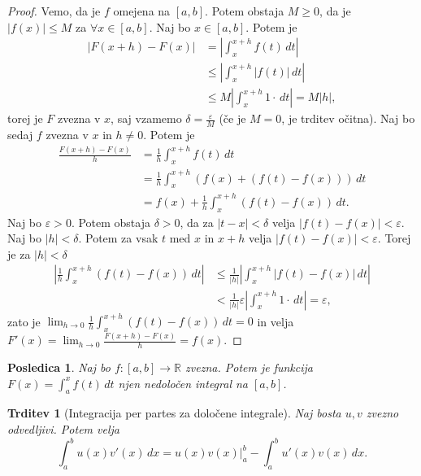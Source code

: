 \documentclass[10pt, a4paper]{article}
\newtheorem{posledica}[izr]{Posledica}
\newtheorem{trditev}[izr]{Trditev}
\newenvironment{noticeC}{%
  \tcolorbox[%
  notitle,
  empty,
  enhanced,  %
  breakable,
  coltext=black, 
  fontupper=\rmfamily,
  parbox=false,
  noparskip,
  sharp corners,
  boxrule=-1pt,  %
  frame hidden,
  left=7pt,  %
  right=7pt,
  top=5pt,
  bottom=5pt,
  before skip=2.5ex plus 2pt,
  after skip=2.5ex plus 2pt,
  overlay unbroken and last={%
  },
  ]}
{\endtcolorbox}
\newenvironment{dokaz}%
  {\begin{noticeC}\begin{proof}}%
  {\end{proof}\end{noticeC}}
\newcommand{\R}{\mathbb {R}}
\newcommand{\limf}[3]{\lim_{#1 \to #2} {#3}}
\begin{document}
\begin{dokaz}
    Vemo, da je $f$ omejena na $[a, b].$ Potem obstaja $M \geq 0$, da je $|f(x)| \leq M$ za $\forall x \in [a, b]$.
    Naj bo $x \in [a, b].$ Potem je 
    \begin{align*}
        \left| F(x+h) - F(x) \right| &= \left| \int_x ^{x+h} f(t)\,dt \right|\\
        &\leq \left| \int_x ^{x+h} |f(t)|\,dt \right|\\
        &\leq M \left| \int_x ^{x+h} 1 \cdot\,dt \right| = M |h|,
    \end{align*}
    torej je $F$ zvezna v $x$, saj vzamemo $\delta = \frac{\varepsilon}{M}$ (če je $M = 0$, je trditev očitna).
    Naj bo sedaj $f$ zvezna v $x$ in $h \neq 0$. Potem je 
    \begin{align*}
        \frac{F(x+h) - F(x)}{h} &= \frac{1}{h} \int_{x} ^{x+h} f(t)\,dt\\
        &= \frac{1}{h} \int_{x} ^{x+h} (f(x) + (f(t) - f(x)))\,dt\\
        &= f(x) + \frac{1}{h} \int_{x} ^{x+h} (f(t) - f(x))\,dt.
    \end{align*}
    Naj bo $\varepsilon > 0.$ Potem obstaja $\delta > 0$, da za $|t-x| < \delta$ velja $|f(t) - f(x)| < \varepsilon.$
    Naj bo $|h| < \delta.$ Potem za vsak $t$ med $x$ in $x + h$ velja $|f(t) - f(x)| < \varepsilon$.
    Torej je za $|h| < \delta$
    \begin{align*}
        \left| \frac{1}{h} \int_x ^{x+h} (f(t) - f(x))\,dt \right| &\leq \frac{1}{|h|} \left| \int_x ^{x+h} |f(t) - f(x)|\,dt \right| \\
        &< \frac{1}{|h|} \varepsilon \left| \int_x ^{x+h} 1 \cdot\,dt \right| = \varepsilon,
    \end{align*}
    zato je $\limf{h}{0}{\frac{1}{h} \int_x ^{x+h} (f(t) - f(x))\,dt} = 0$ in velja $F'(x) = \limf{h}{0}{\frac{F(x+h) - F(x)}{h}} = f(x).$
\end{dokaz}

\begin{posledica}
    Naj bo $f: [a, b] \rightarrow \R$ zvezna. Potem je funkcija $F(x) = \int_a ^x f(t)\,dt$ njen nedoločen integral na $[a, b]$.
\end{posledica}

\begin{trditev}[Integracija per partes za določene integrale]
    Naj bosta $u, v$ zvezno odvedljivi.
    Potem velja $$\int_a ^b u(x) v'(x)\,dx = u(x) v(x) \Big| _a ^b - \int_a ^b u'(x) v(x)\,dx.$$
\end{trditev}
\end{document}
